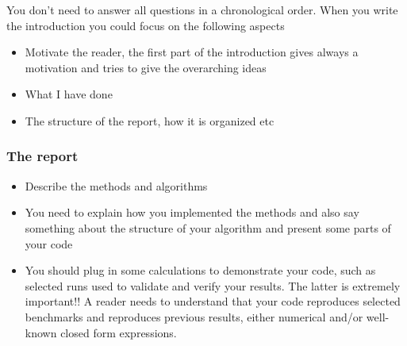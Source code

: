 \documentclass{beamer}
\newenvironment{block_mdfboxadmon}[1][]{\begin{block}{#1}}{\end{block}}
\begin{document}
\begin{frame}
\begin{block_mdfboxadmon}
You don't need to answer all questions in a chronological order.  When you write the introduction you could focus on the following aspects
\begin{itemize}
 \item Motivate the reader, the first part of the introduction gives always a motivation and tries to give the overarching ideas

 \item What I have done

 \item The structure of the report, how it is organized etc
\end{itemize}

\noindent
\end{block_mdfboxadmon}
\end{frame}

\begin{frame}
\frametitle{The report}

\begin{block_mdfboxadmon}
\begin{itemize}
 \item Describe the methods and algorithms

 \item You need to explain how you implemented the methods and also say something about the structure of your algorithm and present some parts of your code

 \item You should plug in some calculations to demonstrate your code, such as selected runs used to validate and verify your results. The latter is extremely important!!  A reader needs to understand that your code reproduces selected benchmarks and reproduces previous results, either numerical and/or well-known  closed form expressions.
\end{itemize}

\noindent
\end{block_mdfboxadmon}
\end{frame}
\end{document}
